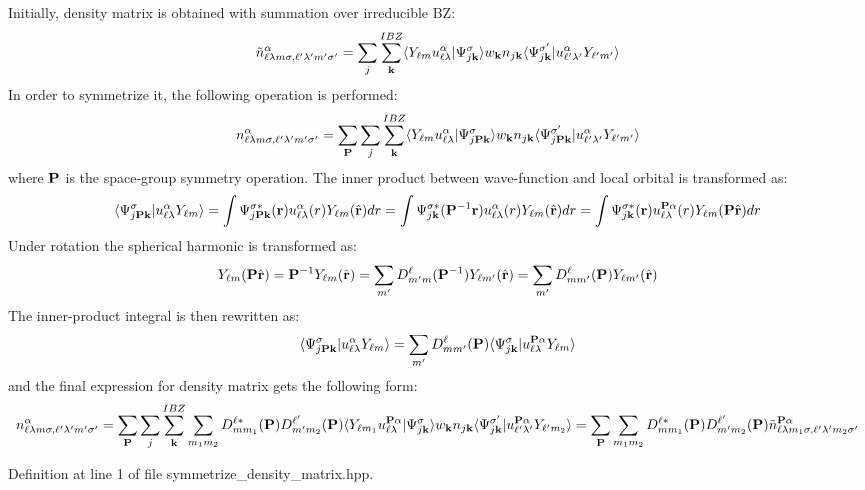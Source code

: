 Initially, density matrix is obtained with summation over irreducible B\+Z\+: \[ \tilde n_{\ell \lambda m \sigma, \ell' \lambda' m' \sigma'}^{\alpha} = \sum_{j} \sum_{{\bf k}}^{IBZ} \langle Y_{\ell m} u_{\ell \lambda}^{\alpha}| \Psi_{j{\bf k}}^{\sigma} \rangle w_{\bf k} n_{j{\bf k}} \langle \Psi_{j{\bf k}}^{\sigma'} | u_{\ell' \lambda'}^{\alpha} Y_{\ell' m'} \rangle \] In order to symmetrize it, the following operation is performed\+: \[ n_{\ell \lambda m \sigma, \ell' \lambda' m' \sigma'}^{\alpha} = \sum_{{\bf P}} \sum_{j} \sum_{\bf k}^{IBZ} \langle Y_{\ell m} u_{\ell \lambda}^{\alpha}| \Psi_{j{\bf P}{\bf k}}^{\sigma} \rangle w_{\bf k} n_{j{\bf k}} \langle \Psi_{j{\bf P}{\bf k}}^{\sigma'} | u_{\ell' \lambda'}^{\alpha} Y_{\ell' m'} \rangle \] where $ {\bf P} $ is the space-\/group symmetry operation. The inner product between wave-\/function and local orbital is transformed as\+: \[ \langle \Psi_{j{\bf P}{\bf k}}^{\sigma} | u_{\ell \lambda}^{\alpha} Y_{\ell m} \rangle = \int \Psi_{j{\bf P}{\bf k}}^{\sigma *}({\bf r}) u_{\ell \lambda}^{\alpha}(r) Y_{\ell m}(\hat {\bf r}) dr = \int \Psi_{j{\bf k}}^{\sigma *}({\bf P}^{-1}{\bf r}) u_{\ell \lambda}^{\alpha}(r) Y_{\ell m}(\hat {\bf r}) dr = \int \Psi_{j{\bf k}}^{\sigma *}({\bf r}) u_{\ell \lambda}^{{\bf P}\alpha}(r) Y_{\ell m}({\bf P} \hat{\bf r}) dr \] Under rotation the spherical harmonic is transformed as\+: \[ Y_{\ell m}({\bf P} \hat{\bf r}) = {\bf P}^{-1}Y_{\ell m}(\hat {\bf r}) = \sum_{m'} D_{m'm}^{\ell}({\bf P}^{-1}) Y_{\ell m'}(\hat {\bf r}) = \sum_{m'} D_{mm'}^{\ell}({\bf P}) Y_{\ell m'}(\hat {\bf r}) \] The inner-\/product integral is then rewritten as\+: \[ \langle \Psi_{j{\bf P}{\bf k}}^{\sigma} | u_{\ell \lambda}^{\alpha} Y_{\ell m} \rangle = \sum_{m'} D_{mm'}^{\ell}({\bf P}) \langle \Psi_{j{\bf k}}^{\sigma} | u_{\ell \lambda}^{{\bf P}\alpha} Y_{\ell m} \rangle \] and the final expression for density matrix gets the following form\+: \[ n_{\ell \lambda m \sigma, \ell' \lambda' m' \sigma'}^{\alpha} = \sum_{{\bf P}} \sum_{j} \sum_{\bf k}^{IBZ} \sum_{m_1 m_2} D_{mm_1}^{\ell *}({\bf P}) D_{m'm_2}^{\ell'}({\bf P}) \langle Y_{\ell m_1} u_{\ell \lambda}^{{\bf P} \alpha}| \Psi_{j{\bf k}}^{\sigma} \rangle w_{\bf k} n_{j{\bf k}} \langle \Psi_{j{\bf k}}^{\sigma'} | u_{\ell' \lambda'}^{{\bf P}\alpha} Y_{\ell' m_2} \rangle = \sum_{{\bf P}} \sum_{m_1 m_2} D_{mm_1}^{\ell *}({\bf P}) D_{m'm_2}^{\ell'}({\bf P}) \tilde n_{\ell \lambda m_1 \sigma, \ell' \lambda' m_2 \sigma'}^{{\bf P}\alpha} \] 

Definition at line 1 of file symmetrize\+\_\+density\+\_\+matrix.\+hpp.

